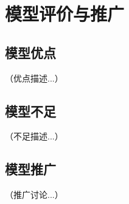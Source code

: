 
\section{模型评价与推广}

\subsection{模型优点}


（优点描述...）

\subsection{模型不足}


（不足描述...）

\subsection{模型推广}


（推广讨论...）

